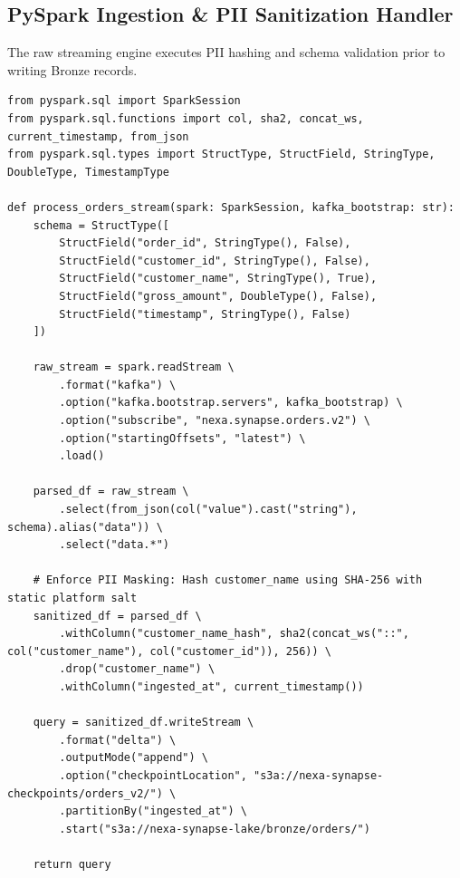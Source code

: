 \documentclass[10pt, a4paper]{article}
\begin{document}
\vspace{3pt}

\subsection{PySpark Ingestion \& PII Sanitization Handler}
The raw streaming engine executes PII hashing and schema validation prior to writing Bronze records.

\vspace{2pt}

\begin{lstlisting}[style=pysparkstyle, caption={PySpark Processor: \texttt{jobs/ingest\_orders\_stream.py}}]
from pyspark.sql import SparkSession
from pyspark.sql.functions import col, sha2, concat_ws, current_timestamp, from_json
from pyspark.sql.types import StructType, StructField, StringType, DoubleType, TimestampType

def process_orders_stream(spark: SparkSession, kafka_bootstrap: str):
    schema = StructType([
        StructField("order_id", StringType(), False),
        StructField("customer_id", StringType(), False),
        StructField("customer_name", StringType(), True),
        StructField("gross_amount", DoubleType(), False),
        StructField("timestamp", StringType(), False)
    ])

    raw_stream = spark.readStream \
        .format("kafka") \
        .option("kafka.bootstrap.servers", kafka_bootstrap) \
        .option("subscribe", "nexa.synapse.orders.v2") \
        .option("startingOffsets", "latest") \
        .load()

    parsed_df = raw_stream \
        .select(from_json(col("value").cast("string"), schema).alias("data")) \
        .select("data.*")

    # Enforce PII Masking: Hash customer_name using SHA-256 with static platform salt
    sanitized_df = parsed_df \
        .withColumn("customer_name_hash", sha2(concat_ws("::", col("customer_name"), col("customer_id")), 256)) \
        .drop("customer_name") \
        .withColumn("ingested_at", current_timestamp())

    query = sanitized_df.writeStream \
        .format("delta") \
        .outputMode("append") \
        .option("checkpointLocation", "s3a://nexa-synapse-checkpoints/orders_v2/") \
        .partitionBy("ingested_at") \
        .start("s3a://nexa-synapse-lake/bronze/orders/")
        
    return query
\end{lstlisting}
\end{document}
